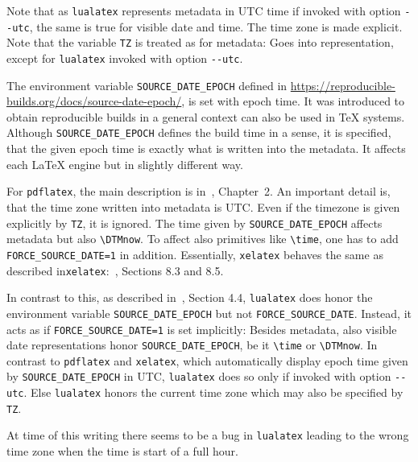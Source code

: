 \documentclass[a4paper, english]{article}%
\newcommand{\pdflatex}{\texttt{pdflatex}}
\newcommand{\lualatex}{\texttt{lualatex}}
\newcommand{\xelatex}{\texttt{xelatex}}
\newcommand{\cmd}[1]{\texttt{\textbackslash#1}}
\begin{document}
Note that as \lualatex{} represents metadata in UTC time if invoked with option \texttt{-{}-utc}, 
the same is true for visible date and time. 
The time zone is made explicit. 
Note that the variable \texttt{TZ} is treated as for metadata: 
Goes into representation, except for \lualatex{} invoked with option \texttt{-{}-utc}. 
\medskip








The environment variable \texttt{SOURCE\_DATE\_EPOCH} 
defined in \url{https://reproducible-builds.org/docs/source-date-epoch/}, 
is set with epoch time. 
It was introduced to obtain reproducible builds in a general context 
can also be used in \TeX{} systems. 
Although \texttt{SOURCE\_DATE\_EPOCH} defines the build time in a sense, 
it is specified, that the given epoch time is exactly what is written into the metadata. 
It affects each \LaTeX{} engine but in slightly different way. 

For \pdflatex, the main description is in~\cite{PdfTexUsr24}, Chapter~2.
An important detail is, that the time zone written into metadata is UTC\@. 
Even if the timezone is given explicitly by \texttt{TZ}, it is ignored. 
The time given by \texttt{SOURCE\_DATE\_EPOCH} affects metadata but also \cmd{DTMnow}. 
To affect also primitives like \cmd{time}, 
one has to add \texttt{FORCE\_SOURCE\_DATE=1} in addition. 
Essentially, \xelatex{} behaves the same as described in\xelatex:~\cite{XeTexRef24}, Sections 8.3 and 8.5. 

In contrast to this, as described in~\cite{LuaTexRef24}, Section 4.4, 
\lualatex{} does honor the environment variable \texttt{SOURCE\_DATE\_EPOCH} but not \texttt{FORCE\_SOURCE\_DATE}. 
Instead, it acts as if \texttt{FORCE\_SOURCE\_DATE=1} is set implicitly: 
Besides metadata, also visible date representations honor \texttt{SOURCE\_DATE\_EPOCH}, 
be it \cmd{time} or \cmd{DTMnow}. 
In contrast to \pdflatex{} and \xelatex, 
which automatically display epoch time given by \texttt{SOURCE\_DATE\_EPOCH} in UTC, 
\lualatex{} does so only if invoked with option \texttt{-{}-utc}. 
Else \lualatex{} honors the current time zone 
which may also be specified by \texttt{TZ}. 








At time of this writing there seems to be a bug in \lualatex{} 
leading to the wrong time zone 
when the time is start of a full hour. 
\end{document}
